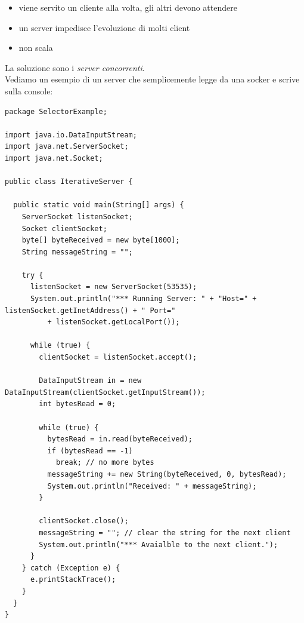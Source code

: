 \documentclass[a4paper,12pt, oneside]{book}
\begin{document}
\begin{itemize}
	\item viene servito un cliente alla volta, gli altri devono attendere
	\item un server impedisce l'evoluzione di molti client
	\item non scala
\end{itemize}
La soluzione sono i \textit{server concorrenti}.\\
Vediamo un esempio di un server che semplicemente legge da una socker e scrive sulla console:
\begin{verbatim}
package SelectorExample;

import java.io.DataInputStream;
import java.net.ServerSocket;
import java.net.Socket;

public class IterativeServer {

  public static void main(String[] args) {
    ServerSocket listenSocket;
    Socket clientSocket;
    byte[] byteReceived = new byte[1000];
    String messageString = "";

    try {
      listenSocket = new ServerSocket(53535);
      System.out.println("*** Running Server: " + "Host=" + listenSocket.getInetAddress() + " Port="
          + listenSocket.getLocalPort());

      while (true) {
        clientSocket = listenSocket.accept();

        DataInputStream in = new DataInputStream(clientSocket.getInputStream());
        int bytesRead = 0;

        while (true) {
          bytesRead = in.read(byteReceived);
          if (bytesRead == -1)
            break; // no more bytes
          messageString += new String(byteReceived, 0, bytesRead);
          System.out.println("Received: " + messageString);
        }

        clientSocket.close();
        messageString = ""; // clear the string for the next client
        System.out.println("*** Avaialble to the next client.");
      }
    } catch (Exception e) {
      e.printStackTrace();
    }
  }
}

\end{verbatim}
\newpage
\end{document}
